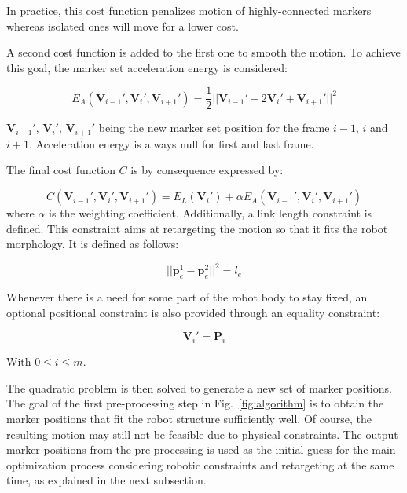 \documentclass[letterpaper, 10 pt, conference]{ieeeconf}  %
\begin{document}
In practice, this cost function penalizes motion of highly-connected
markers whereas isolated ones will move for a lower cost.


A second cost function is added to the first one to smooth the
motion. To achieve this goal, the marker set acceleration energy is
considered:

\begin{equation}
  E_A(\mathbf{V}_{i-1}', \mathbf{V}_{i}', \mathbf{V}_{i+1}') =
  \frac{1}{2} || \mathbf{V}_{i-1}' - 2 \mathbf{V}_{i}' + \mathbf{V}_{i+1}' ||^2
\end{equation}

$\mathbf{V}_{i-1}'$, $\mathbf{V}_{i}'$, $\mathbf{V}_{i+1}'$ being the
new marker set position for the frame $i - 1$, $i$ and $i +
1$. Acceleration energy is always null for first and last frame.

The final cost function $C$ is by consequence expressed by:

\begin{equation}
    C(\mathbf{V}_{i-1}', \mathbf{V}_{i}', \mathbf{V}_{i+1}') =
    E_L(\mathbf{V}_{i}') + \alpha E_A(\mathbf{V}_{i-1}',
    \mathbf{V}_{i}', \mathbf{V}_{i+1}') 
\end{equation}
where $\alpha$ is the weighting coefficient.
Additionally, a link length constraint is defined. This constraint
aims at retargeting the motion so that it fits the robot
morphology. It is defined as follows:

\begin{equation}
|| \mathbf{p}^1_e - \mathbf{p}^2_e ||^2 = l_e
\end{equation}


Whenever there is a need for some part of the robot body to stay
fixed, an optional positional constraint is also provided through an
equality constraint:

\begin{equation}
  \mathbf{V}_i' = \mathbf{P}_i
\end{equation}

With $0 \leq i \leq m$.



The quadratic problem is then solved to generate a new set of marker
positions. 
The goal of the first pre-processing step in Fig.~\ref{fig:algorithm}
is to obtain the 
marker positions that fit the robot structure sufficiently well.
Of course, the resulting motion may still not be feasible due to
physical constraints.
The output marker positions from the pre-processing is used as the
initial guess for the main optimization process considering robotic
constraints and retargeting at the same time, as explained in the next
subsection. 
\end{document}

